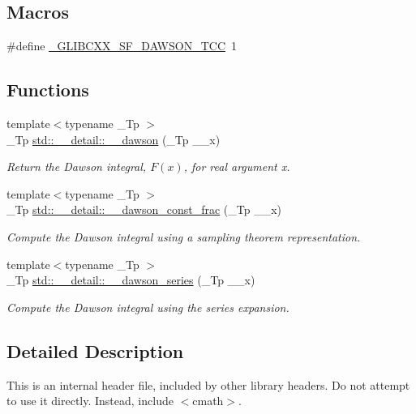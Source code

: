 \subsection*{Macros}
\begin{DoxyCompactItemize}
\item 
\#define \hyperlink{sf__dawson_8tcc_a72d0ce5cd51240da4fb2546e640923de}{\+\_\+\+G\+L\+I\+B\+C\+X\+X\+\_\+\+S\+F\+\_\+\+D\+A\+W\+S\+O\+N\+\_\+\+T\+C\+C}~1
\end{DoxyCompactItemize}
\subsection*{Functions}
\begin{DoxyCompactItemize}
\item 
{\footnotesize template$<$typename \+\_\+\+Tp $>$ }\\\+\_\+\+Tp \hyperlink{namespacestd_1_1____detail_a6384fb4c5af31b41a38c120869a548c7}{std\+::\+\_\+\+\_\+detail\+::\+\_\+\+\_\+dawson} (\+\_\+\+Tp \+\_\+\+\_\+x)
\begin{DoxyCompactList}\small\item\em Return the Dawson integral, $ F(x) $, for real argument {\ttfamily x}. \end{DoxyCompactList}\item 
{\footnotesize template$<$typename \+\_\+\+Tp $>$ }\\\+\_\+\+Tp \hyperlink{namespacestd_1_1____detail_a3fe9fa143beb1a5d9f8ca18b3783f650}{std\+::\+\_\+\+\_\+detail\+::\+\_\+\+\_\+dawson\+\_\+const\+\_\+frac} (\+\_\+\+Tp \+\_\+\+\_\+x)
\begin{DoxyCompactList}\small\item\em Compute the Dawson integral using a sampling theorem representation. \end{DoxyCompactList}\item 
{\footnotesize template$<$typename \+\_\+\+Tp $>$ }\\\+\_\+\+Tp \hyperlink{namespacestd_1_1____detail_a033d91cc1c67280385ff3d1d809a21d1}{std\+::\+\_\+\+\_\+detail\+::\+\_\+\+\_\+dawson\+\_\+series} (\+\_\+\+Tp \+\_\+\+\_\+x)
\begin{DoxyCompactList}\small\item\em Compute the Dawson integral using the series expansion. \end{DoxyCompactList}\end{DoxyCompactItemize}


\subsection{Detailed Description}
This is an internal header file, included by other library headers. Do not attempt to use it directly. Instead, include $<$cmath$>$. 

